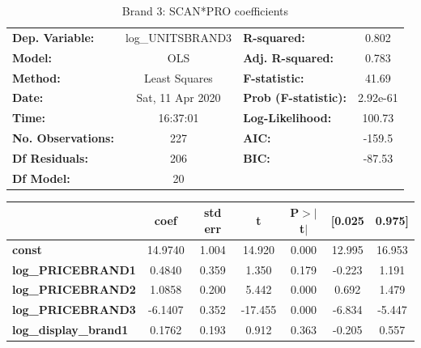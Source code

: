 \documentclass[a4paper,11pt]{article}
\begin{document}
\begin{center}
\begin{table}
\caption{Brand 3: SCAN*PRO coefficients}\label{tab:brand3}
\begin{tabular}{lclc}
\toprule
\textbf{Dep. Variable:}        & log\_UNITSBRAND3 & \textbf{  R-squared:         } &     0.802   \\
\textbf{Model:}                &       OLS        & \textbf{  Adj. R-squared:    } &     0.783   \\
\textbf{Method:}               &  Least Squares   & \textbf{  F-statistic:       } &     41.69   \\
\textbf{Date:}                 & Sat, 11 Apr 2020 & \textbf{  Prob (F-statistic):} &  2.92e-61   \\
\textbf{Time:}                 &     16:37:01     & \textbf{  Log-Likelihood:    } &    100.73   \\
\textbf{No. Observations:}     &         227      & \textbf{  AIC:               } &    -159.5   \\
\textbf{Df Residuals:}         &         206      & \textbf{  BIC:               } &    -87.53   \\
\textbf{Df Model:}             &          20      & \textbf{                     } &             \\
\bottomrule
\end{tabular}
\end{table}
\begin{tabular}{lcccccc}
                               & \textbf{coef} & \textbf{std err} & \textbf{t} & \textbf{P$> |$t$|$} & \textbf{[0.025} & \textbf{0.975]}  \\
\midrule
\textbf{const}                 &      14.9740  &        1.004     &    14.920  &         0.000        &       12.995    &       16.953     \\
\textbf{log\_PRICEBRAND1}      &       0.4840  &        0.359     &     1.350  &         0.179        &       -0.223    &        1.191     \\
\textbf{log\_PRICEBRAND2}      &       1.0858  &        0.200     &     5.442  &         0.000        &        0.692    &        1.479     \\
\textbf{log\_PRICEBRAND3}      &      -6.1407  &        0.352     &   -17.455  &         0.000        &       -6.834    &       -5.447     \\
\textbf{log\_display\_brand1}  &       0.1762  &        0.193     &     0.912  &         0.363        &       -0.205    &        0.557     \\

\end{tabular}
\end{center}
\end{document}
